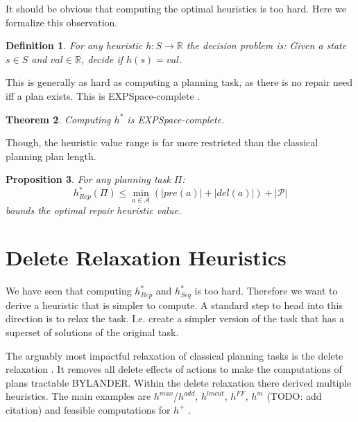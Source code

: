 \documentclass[twocolumn]{article}
\newcommand{\task}{\ensuremath{\Pi}\xspace}
\newcommand{\preds}{\ensuremath{\mathcal{P}}\xspace}
\newcommand{\acts}{\ensuremath{\mathcal{A}}\xspace}
\newcommand{\states}{\ensuremath{S}\xspace}
\newcommand{\someState}{\ensuremath{s}\xspace}
\newcommand{\prename}{\ensuremath{pre}\xspace}
\newcommand{\delname}{\ensuremath{del}\xspace}
\newcommand{\pre}[1]{\ensuremath{\prename(#1)}\xspace}
\newcommand{\del}[1]{\ensuremath{\delname(#1)}\xspace}
\newcommand{\arity}[1]{\ensuremath{|#1|}}
\newcommand{\someAct}{\ensuremath{a}\xspace}
\newcommand{\optimalHeuristic}{\ensuremath{h^{*}_{Rep}}\xspace}
\newcommand{\optimalHeuristicSeq}{\ensuremath{h^{*}_{Seq}}\xspace}
\newtheorem{theorem}{Theorem}
\newtheorem{proposition}[theorem]{Proposition}
\newtheorem{definition}[theorem]{Definition}
\begin{document}
	It should be obvious that computing the optimal heuristics is too hard. 
	Here we formalize this observation.
	
	\begin{definition}
		For any heuristic $h: \states \rightarrow \mathbb{R}$ the decision problem is:
		Given a state $\someState \in \states$ and $\mathit{val} \in \mathbb{R}$, decide if $h(\someState) = \mathit{val}$.
	\end{definition}
	
	
	This is generally as hard as computing a planning task, as there is no repair need iff a plan exists.
	This is EXPSpace-complete \citep{erol:etal:tr-91}.
	
	\begin{theorem}
		Computing $h^*$ is EXPSpace-complete.
	\end{theorem}
	
	Though, the heuristic value range is far more restricted than the classical 
	planning plan length.
	
	\begin{proposition}
		For any planning task \task:
		$$\optimalHeuristic(\task) \leq \min_{\someAct \in \acts}(\arity{\pre{\someAct}} + \arity{\del{\someAct}}) + \arity{\preds}$$
		bounds the optimal repair heuristic value.
	\end{proposition}

	
	\section{Delete Relaxation Heuristics}
	
	
	We have seen that computing \optimalHeuristic and \optimalHeuristicSeq is too hard.
	Therefore we want to derive a heuristic that is simpler to compute.
	A standard step to head into this direction is to relax the task.
	I.e. create a simpler version of the task that has a superset of solutions of the original task.
	
	The arguably most impactful relaxation of classical planning tasks is the delete relaxation \cite{bonet:geffner:aij-01}.
 	It removes all delete effects of actions to make the computations of plans tractable BYLANDER.
	Within the delete relaxation there derived multiple heuristics.
	The main examples are
	$h^{max}$/$h^{add}$\citep{bonet:geffner:aij-01}, 
	$h^{lmcut}$\citep{helmert:domshlak:icaps-09},
	$h^{FF}$\citep{hoffmann:nebel:jair-01},
	$h^{m}$ (TODO: add citation)
	and 
	feasible computations for $h^{+}$ \citep{bonet:helmert:ecai-10,imai:fukunaga:ecai-14}.
	
\end{document}
